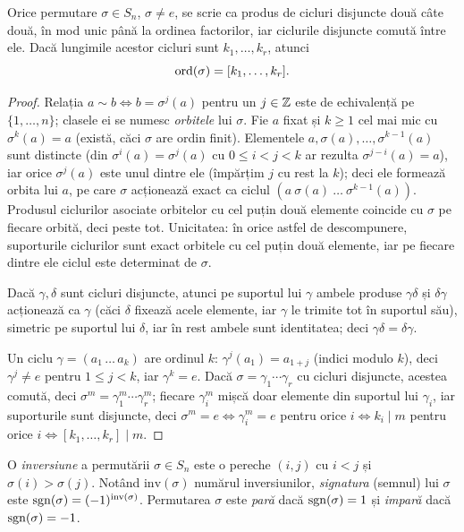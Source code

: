 \begin{teorema}\label{teo:cicluri}
Orice permutare $\sigma\in S_n$, $\sigma\neq e$, se scrie ca produs de cicluri disjuncte două câte două, în mod unic până la ordinea factorilor, iar ciclurile disjuncte comută între ele. Dacă lungimile acestor cicluri sunt $k_1,\dots,k_r$, atunci
\[
\operatorname{ord}(\sigma)=[k_1,\dots,k_r].
\]
\end{teorema}

\begin{proof}
Relația $a\sim b\iff b=\sigma^j(a)$ pentru un $j\in\mathbb{Z}$ este de echivalență pe $\{1,\dots,n\}$; clasele ei se numesc \emph{orbitele} lui $\sigma$. Fie $a$ fixat și $k\ge1$ cel mai mic cu $\sigma^k(a)=a$ (există, căci $\sigma$ are ordin finit). Elementele $a,\sigma(a),\dots,\sigma^{k-1}(a)$ sunt distincte (din $\sigma^i(a)=\sigma^j(a)$ cu $0\le i<j<k$ ar rezulta $\sigma^{j-i}(a)=a$), iar orice $\sigma^j(a)$ este unul dintre ele (împărțim $j$ cu rest la $k$); deci ele formează orbita lui $a$, pe care $\sigma$ acționează exact ca ciclul $(a\ \sigma(a)\ \dots\ \sigma^{k-1}(a))$. Produsul ciclurilor asociate orbitelor cu cel puțin două elemente coincide cu $\sigma$ pe fiecare orbită, deci peste tot. Unicitatea: în orice astfel de descompunere, suporturile ciclurilor sunt exact orbitele cu cel puțin două elemente, iar pe fiecare dintre ele ciclul este determinat de $\sigma$.

Dacă $\gamma,\delta$ sunt cicluri disjuncte, atunci pe suportul lui $\gamma$ ambele produse $\gamma\delta$ și $\delta\gamma$ acționează ca $\gamma$ (căci $\delta$ fixează acele elemente, iar $\gamma$ le trimite tot în suportul său), simetric pe suportul lui $\delta$, iar în rest ambele sunt identitatea; deci $\gamma\delta=\delta\gamma$.

Un ciclu $\gamma=(a_1\,\dots\,a_k)$ are ordinul $k$: $\gamma^j(a_1)=a_{1+j}$ (indici modulo $k$), deci $\gamma^j\neq e$ pentru $1\le j<k$, iar $\gamma^k=e$. Dacă $\sigma=\gamma_1\cdots\gamma_r$ cu cicluri disjuncte, acestea comută, deci $\sigma^m=\gamma_1^m\cdots\gamma_r^m$; fiecare $\gamma_i^m$ mișcă doar elemente din suportul lui $\gamma_i$, iar suporturile sunt disjuncte, deci $\sigma^m=e\iff\gamma_i^m=e$ pentru orice $i\iff k_i\mid m$ pentru orice $i\iff[k_1,\dots,k_r]\mid m$.
\end{proof}

\begin{definitie}[signatura]\label{def:sgn}
O \emph{inversiune} a permutării $\sigma\in S_n$ este o pereche $(i,j)$ cu $i<j$ și $\sigma(i)>\sigma(j)$. Notând $\mathrm{inv}(\sigma)$ numărul inversiunilor, \emph{signatura} (semnul) lui $\sigma$ este $\operatorname{sgn}(\sigma)=(-1)^{\mathrm{inv}(\sigma)}$. Permutarea $\sigma$ este \emph{pară} dacă $\operatorname{sgn}(\sigma)=1$ și \emph{impară} dacă $\operatorname{sgn}(\sigma)=-1$.
\end{definitie}

